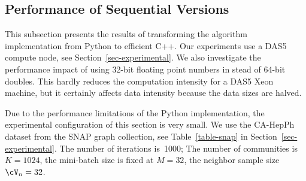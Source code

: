 \subsection{Performance of Sequential Versions}

This subsection presents the results of transforming the algorithm
implementation from Python to efficient C++.
Our experiments use a DAS5 compute node, see Section~\ref{sec-experimental}.
%
We also investigate the performance impact of using
32-bit floating point numbers in stead of 64-bit doubles.
This hardly reduces the computation intensity for a DAS5 Xeon machine, but
it certainly affects data intensity because the data sizes are halved.
%

Due to the performance limitations of the Python implementation, the
experimental configuration of this section is very small.
%
We use the CA-HepPh dataset from the SNAP graph collection, see
Table~\ref{table-snap} in Section~\ref{sec-experimental}. The number of
iterations is~1000;
The number of communities is $K=1024$, the mini-batch size is fixed at $M=32$, the
neighbor sample size $\Neighbors=32$.

\begin{comment}
******** Unnecessary detail?
The mini-batch sampling as described in Section~\ref{sec-background} randomly
chooses either a mini-batch of link edges, whose size is the degree of one
randomly selected vertex, or a mini-batch of nonlink edges, whose size is
specified as a model parameter. In this evaluation, we only select batches
of nonlink edges because that makes the mini-batch size, and hence the
execution times, deterministic. We separately validated that the time spent
\textit{per mini-batch vertex} for samples of link edges and nonlink edges
is fully consistent.
\end{comment}

